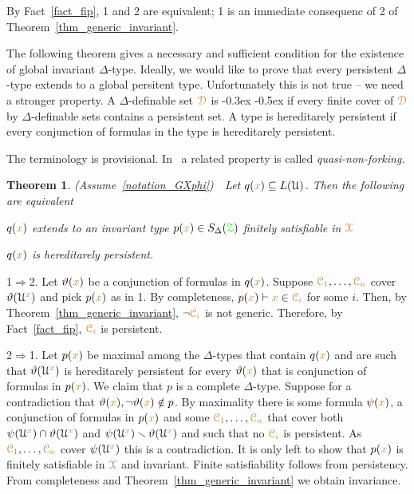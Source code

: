 \documentclass[10pt,openany]{amsproc}
\makeatletter
\newcommand{\mylabel}[1]{{\ssf{#1}}\hfill}
\renewenvironment{itemize}
  {\begin{list}{}{%
   \setlength{\parskip}{0mm}
   \setlength{\topsep}{.2\baselineskip}
   \setlength{\rightmargin}{0mm}
   \setlength{\listparindent}{0mm}
   \setlength{\itemindent}{0mm}
   \setlength{\labelwidth}{2ex}
   \setlength{\itemsep}{.1\baselineskip}
   \setlength{\parsep}{0mm}
   \setlength{\partopsep}{0mm}
   \setlength{\labelsep}{1ex}
   \setlength{\leftmargin}{\labelwidth+\labelsep}
   \let\makelabel\mylabel
   }}
   {\vspace*{-.3\baselineskip}\end{list}}
\def\proves{\vdash}
\def\IMP{\Rightarrow}
\def\D{\EuScript D}
\def\X{\EuScript X}
\def\Z{\EuScript Z}
\def\C{\EuScript C}
\def\U{\EuScript U}
\def\theta{\vartheta}
\def\ssf#1{\textsf{\small #1}}
\newcounter{thm}
\theoremstyle{mio}
\newtheorem{theorem}[thm]{Theorem}\tcolorboxenvironment{theorem}{mythm}
\providecommand{\proofNameStyle}{\bfseries}
\renewenvironment{proof}[1][\proofname]{\par
  \pushQED{\qed}%
  \normalfont%
  \trivlist
  \item[\hskip\labelsep
        \proofNameStyle
    #1\@addpunct{.}]\ignorespaces
}{%
  \popQED\endtrivlist\@endpefalse
}
\def\mr{\color{brown}}
\def\gr{\color{green}}
\def\mrD{{\mr\D}}
\def\mrX{{\mr\X}}
\def\grZ{{\gr\Z}}
\renewcommand*{\emph}[1]{%
\kern-0.3ex
\smash{\tikz[baseline]\node[rectangle, fill=black!20!yellow!50!white, rounded corners, inner xsep=0.5ex, inner ysep=0.2ex, anchor=base, minimum height = 2.7ex]{#1};}\kern-0.5ex
}
\makeatother
\begin{document}
\begin{proof}
  By Fact~\ref{fact_fip}, \ssf1 and \ssf2 are equivalent; \ssf1 is an immediate consequenc of \ssf2 of Theorem~\ref{thm_generic_invariant}.
\end{proof}

The following theorem gives a necessary and sufficient condition for the  existence of global invariant $\Delta$-type.
Ideally, we would like to prove that every persistent $\Delta$-type extends to a global persitent type.
Unfortunately this is not true -- we need a stronger property.
A $\Delta$-definable set $\mrD$ is \emph{hereditarely persistent\/} if every finite cover of $\mrD$ by $\Delta$-definable sets contains a persistent set.
A type is hereditarely persistent if every conjunction of formulas in the type is hereditarely persistent.

The terminology is provisional.
In~\cite{CK} a related property is called \textit{quasi-non-forking.}

\begin{theorem}\label{thm_generic_invariant2}
  (Assume~\ref{notation_GXphi})\ \  
  Let $q({\mr x})\subseteq L(\U)$.
  Then the following are equivalent 
  \begin{itemize}
    \item[1.] $q({\mr x})$ extends to an invariant type $p({\mr x})\in S_\Delta(\grZ)$ finitely satisfiable in $\mrX$
    \item[2.] $q({\mr x})$ is hereditarely persistent.
  \end{itemize}
\end{theorem}

\begin{proof}
  \ssf1$\IMP$\ssf2.
  Let $\theta({\mr x})$ be a conjunction of formulas in $q({\mr x})$.
  Suppose ${\mr\C_1},\dots,{\mr\C_n}$ cover $\theta(\U^{\mr x})$ and pick $p({\mr x})$ as in \ssf1.
  By completeness, $p({\mr x})\proves {\mr x}\in{\mr\C_i}$ for some $i$.
  Then, by Theorem~\ref{thm_generic_invariant}, $\neg{\mr\C_i}$ is not generic.
  Therefore, by Fact~\ref{fact_fip}, ${\mr\C_i}$ is persistent.

  \ssf2$\IMP$\ssf1.
  Let $p({\mr x})$ be maximal among the $\Delta$-types that contain $q({\mr x})$ and are such that $\theta(\U^{\mr x})$ is hereditarely persistent for every $\theta({\mr x})$ that is conjunction of formulas in $p({\mr x})$.
  We claim that $p$ is a complete $\Delta$-type.
  Suppose for a contradiction that $\theta({\mr x}),\neg\theta({\mr x})\notin p$.
  By maximality there is some formula $\psi({\mr x})$, a conjunction of formulas in $p({\mr x})$ and some ${\mr\C_1},\dots,{\mr\C_n}$ that cover both $\psi(\U^{\mr x})\cap\theta(\U^{\mr x})$ and $\psi(\U^{\mr x})\smallsetminus\theta(\U^{\mr x})$ and such that no ${\mr\C_i}$ is persistent.
  As ${\mr\C_1},\dots,{\mr\C_n}$ cover $\psi(\U^{\mr x})$ this is a contradiction.
  It is only left to show that $p({\mr x})$ is finitely satisfiable in $\mrX$ and invariant.
  Finite satisfiability follows from persistency.
  From completeness and Theorem~\ref{thm_generic_invariant} we obtain invariance.
\end{proof}
\end{document}
